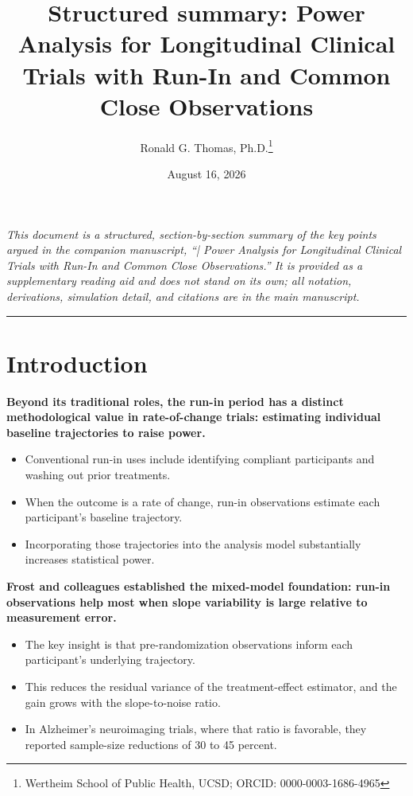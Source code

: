 \documentclass[
  11pt,
]{article}
\title{Structured summary: \textbar{} Power Analysis for Longitudinal Clinical Trials with Run-In and Common Close Observations}
\author{Ronald G. Thomas, Ph.D.\thanks{Wertheim School of Public Health, UCSD; ORCID: 0000-0003-1686-4965}}
\date{August 16, 2026}
\begin{document}
\maketitle

{
\setcounter{tocdepth}{2}
\tableofcontents
}
\emph{This document is a structured, section-by-section summary of the key points argued in the companion manuscript, ``| Power Analysis for Longitudinal Clinical Trials with Run-In and Common Close Observations.'' It is provided as a supplementary reading aid and does not stand on its own; all notation, derivations, simulation detail, and citations are in the main manuscript.}

\bigskip\noindent

\rule{\textwidth}{0.4pt}\bigskip

\section{Introduction}\label{introduction}

\textbf{Beyond its traditional roles, the run-in period has a distinct methodological value in rate-of-change trials: estimating individual baseline trajectories to raise power.}

\begin{itemize}\setlength{\itemsep}{2pt}\setlength{\parskip}{0pt}
\item Conventional run-in uses include identifying compliant participants and washing out prior treatments.
\item When the outcome is a rate of change, run-in observations estimate each participant's baseline trajectory.
\item Incorporating those trajectories into the analysis model substantially increases statistical power.
\end{itemize}

\textbf{Frost and colleagues established the mixed-model foundation: run-in observations help most when slope variability is large relative to measurement error.}

\begin{itemize}\setlength{\itemsep}{2pt}\setlength{\parskip}{0pt}
\item The key insight is that pre-randomization observations inform each participant's underlying trajectory.
\item This reduces the residual variance of the treatment-effect estimator, and the gain grows with the slope-to-noise ratio.
\item In Alzheimer's neuroimaging trials, where that ratio is favorable, they reported sample-size reductions of 30 to 45 percent.
\end{itemize}
\end{document}
